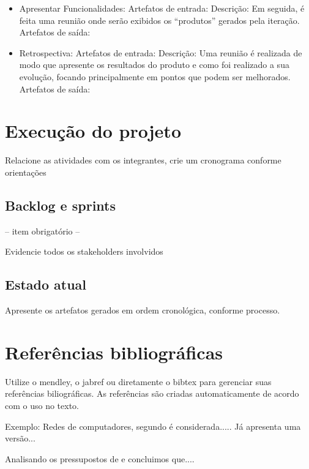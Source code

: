 \documentclass[	DIV=calc,%
							paper=a4,%
							fontsize=12pt,%
							onecolumn]{scrartcl}	 					%
\begin{document}
\begin{itemize}
	\item Apresentar Funcionalidades: 
	\subitem Artefatos de entrada:
	\subitem Descrição: Em seguida, é feita uma reunião onde serão exibidos os “produtos” gerados pela iteração. 
	\subitem Artefatos de saída:
	
	\item Retrospectiva: 
	\subitem Artefatos de entrada:
	\subitem Descrição: Uma reunião é realizada de modo que apresente os resultados do produto e como foi realizado a sua evolução, focando principalmente em pontos que podem ser melhorados.
	\subitem Artefatos de saída:
\end{itemize}


\section{Execução do projeto}

Relacione as atividades com os integrantes, crie um cronograma conforme orientações
\subsection{Backlog e sprints}
-- item obrigatório --

Evidencie todos os stakeholders involvidos


\subsection{Estado atual}
Apresente os artefatos gerados em ordem cronológica, conforme processo.


\section{Referências bibliográficas}
Utilize o mendley, o jabref ou diretamente o bibtex para gerenciar suas referências biliográficas. As referências são criadas automaticamente de acordo com o uso no texto.

Exemplo: Redes de computadores, segundo \cite{t2013} é considerada..... Já \cite{kurose2010} apresenta uma versão...

Analisando os pressupostos de \cite{ref3} e \cite{ref4} concluimos que....


\renewcommand\refname{} %

 
\end{document}
